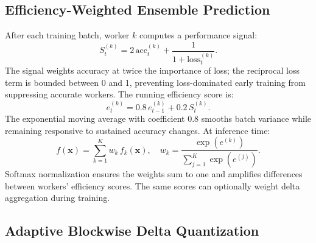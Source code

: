 \documentclass[journal,twoside]{IEEEtran}
\begin{document}
\subsection{Efficiency-Weighted Ensemble Prediction}

After each training batch, worker $k$ computes a performance signal:
\begin{equation}
  S_t^{(k)} = 2\,\mathrm{acc}_t^{(k)} + \frac{1}{1+\mathrm{loss}_t^{(k)}}.
  \label{eq:signal}
\end{equation}
The signal weights accuracy at twice the importance of loss; the
reciprocal loss term is bounded between 0 and 1, preventing
loss-dominated early training from suppressing accurate workers.
The running efficiency score is:
\begin{equation}
  e_t^{(k)} = 0.8\,e_{t-1}^{(k)} + 0.2\,S_t^{(k)}.
  \label{eq:ema}
\end{equation}
The exponential moving average with coefficient 0.8 smooths batch
variance while remaining responsive to sustained accuracy changes. At
inference time:
\begin{equation}
  f(\mathbf{x}) = \sum_{k=1}^K w_k\,f_k(\mathbf{x}), \quad
  w_k = \frac{\exp(e^{(k)})}{\sum_{j=1}^K \exp(e^{(j)})}.
  \label{eq:pred_agg}
\end{equation}
Softmax normalization ensures the weights sum to one and amplifies
differences between workers' efficiency scores. The same scores can
optionally weight delta aggregation during training.

\subsection{Adaptive Blockwise Delta Quantization}
\end{document}
